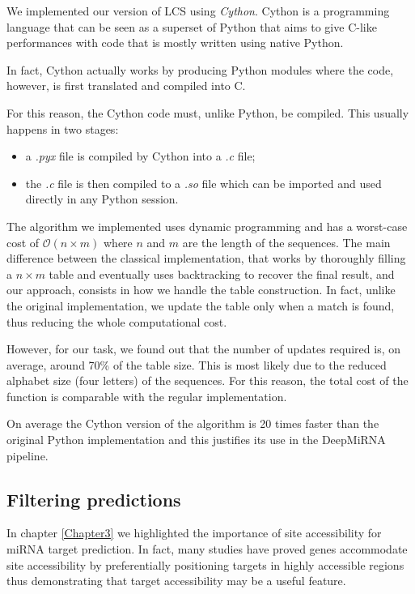 We implemented our version of LCS using \emph{Cython}\cite{cython}. Cython is a programming language that can be seen as a superset of Python that aims to give C-like performances with code that is mostly written using native Python. 

In fact, Cython actually works by producing Python modules where the code, however, is first translated and compiled into C.

For this reason, the Cython code must, unlike Python, be compiled. This usually happens in two stages: 

\begin{itemize}
	\item a \emph{.pyx} file is compiled by Cython into a \emph{.c} file;
	\item the \emph{.c} file is then compiled to a \emph{.so} file which can be imported and used directly in any Python session. 
\end{itemize}   

The algorithm we implemented uses dynamic programming and has a worst-case cost of $\mathcal{O}(n \times m)$ where $n$ and $m$ are the length of the sequences. The main difference between the classical implementation, that works by thoroughly filling a $n \times m$ table and eventually uses  backtracking to recover the final result, and our approach, consists in how we handle the table construction. In fact, unlike the original implementation, we update the table only when a match is found, thus reducing the whole computational cost. 

However, for our task, we found out that the number of updates required is, on average, around 70\% of the table size. This is most likely due to the reduced alphabet size (four letters) of the sequences. For this reason, the total cost of the function is comparable with the regular implementation.

On average the Cython version of the algorithm is 20 times faster than the original Python implementation and this justifies its use in the DeepMiRNA pipeline.

      

\subsection{Filtering predictions} \label{sub:filtering_step}
In chapter \ref{Chapter3} we highlighted the importance of site accessibility for miRNA target prediction. In fact, many studies \cite{helwak} \cite{common_features} have proved genes accommodate site accessibility by preferentially positioning targets in highly accessible regions \cite{accessibility_nrg_role} thus demonstrating that target accessibility may be a useful feature.

